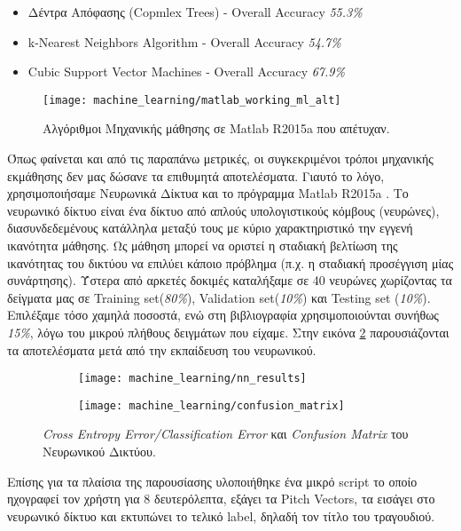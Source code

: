 \begin{itemize}
  \item Δέντρα Απόφασης (Copmlex Trees) - Overall Accuracy \textit{55.3\%}  
  \item k-Nearest Neighbors Algorithm 	- Overall Accuracy \textit{54.7\%}
  \item Cubic Support Vector Machines	- Overall Accuracy \textit{67.9\%}
\end{itemize}

\begin{figure}
        \centering
        \vspace{-20pt}\texttt{[image: machine\_learning/matlab\_working\_ml\_alt]}
        \vspace{-20pt}\caption{Αλγόριθμοι Μηχανικής μάθησης σε Matlab R2015a \cite{matlab} που απέτυχαν.}
        \label{fig:matlab_ml_alg}
\end{figure}

Όπως φαίνεται και από τις παραπάνω μετρικές, οι συγκεκριμένοι τρόποι μηχανικής εκμάθησης δεν μας δώσανε τα επιθυμητά αποτελέσματα. Γιαυτό το λόγο, χρησιμοποιήσαμε Νευρωνικά Δίκτυα και το πρόγραμμα Matlab R2015a \cite{matlab}. Το νευρωνικό δίκτυο είναι ένα δίκτυο από απλούς υπολογιστικούς κόμβους (νευρώνες), διασυνδεδεμένους κατάλληλα μεταξύ τους με κύριο χαρακτηριστικό την εγγενή ικανότητα μάθησης. Ως μάθηση μπορεί να οριστεί η σταδιακή βελτίωση της ικανότητας του δικτύου να επιλύει κάποιο πρόβλημα (π.χ. η σταδιακή προσέγγιση μίας συνάρτησης)\cite{neural_net}. Ύστερα από αρκετές δοκιμές καταλήξαμε σε 40 νευρώνες χωρίζοντας τα δείγματα μας σε Training set(\textit{80\%}), Validation set(\textit{10\%}) και Testing set (\textit{10\%}). Επιλέξαμε τόσο χαμηλά ποσοστά, ενώ στη βιβλιογραφία χρησιμοποιούνται συνήθως \textit{15\%}, λόγω του μικρού πλήθους δειγμάτων που είχαμε. Στην εικόνα \ref{fig:matlab-results} παρουσιάζονται τα αποτελέσματα μετά από την εκπαίδευση του νευρωνικού.

\begin{figure}[htb]
    \centering
    \begin{subfigure}{0.5\linewidth}
        \texttt{[image: machine\_learning/nn\_results]}
    \end{subfigure}\hfill
    \begin{subfigure}{\linewidth}
        \texttt{[image: machine\_learning/confusion\_matrix]}
    \end{subfigure}
    \caption{\textit{Cross Entropy Error/Classification Error} και \textit{Confusion Matrix} του Νευρωνικού Δικτύου.}
    \label{fig:matlab-results}
\end{figure}

Επίσης για τα πλαίσια της παρουσίασης υλοποιήθηκε ένα μικρό script το οποίο ηχογραφεί τον χρήστη για 8 δευτερόλεπτα, εξάγει τα Pitch Vectors, τα εισάγει στο νευρωνικό δίκτυο και εκτυπώνει το τελικό label, δηλαδή τον τίτλο του τραγουδιού.